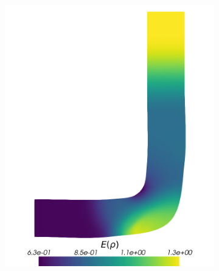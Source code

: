 \begin{figure}[H]
\begin{subfigure}{0.31\linewidth}
		\includegraphics[width=\linewidth]{figs/pipe/euler2D_pipe_n1-4_tg1-3_ERho.png}
		\caption{}
		\label{fig:adIPMSolutionsPipeTGE}
	\end{subfigure}%
	\hfill
	\begin{subfigure}{0.31\linewidth}
		\centering

\end{subfigure}
\end{figure}
